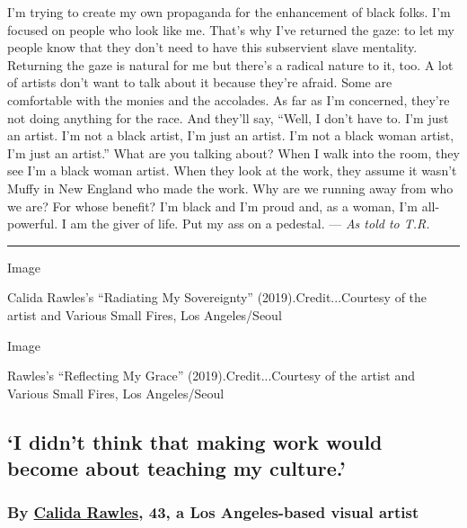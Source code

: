 I'm trying to create my own propaganda for the enhancement of black
folks. I'm focused on people who look like me. That's why I've returned
the gaze: to let my people know that they don't need to have this
subservient slave mentality. Returning the gaze is natural for me but
there's a radical nature to it, too. A lot of artists don't want to talk
about it because they're afraid. Some are comfortable with the monies
and the accolades. As far as I'm concerned, they're not doing anything
for the race. And they'll say, ``Well, I don't have to. I'm just an
artist. I'm not a black artist, I'm just an artist. I'm not a black
woman artist, I'm just an artist.'' What are you talking about? When I
walk into the room, they see I'm a black woman artist. When they look at
the work, they assume it wasn't Muffy in New England who made the work.
Why are we running away from who we are? For whose benefit? I'm black
and I'm proud and, as a woman, I'm all-powerful. I am the giver of life.
Put my ass on a pedestal. --- \emph{As told to T.R.}

\begin{center}\rule{0.5\linewidth}{\linethickness}\end{center}

Image

Calida Rawles's ``Radiating My Sovereignty'' (2019).Credit...Courtesy of
the artist and Various Small Fires, Los Angeles/Seoul

Image

Rawles's ``Reflecting My Grace'' (2019).Credit...Courtesy of the artist
and Various Small Fires, Los Angeles/Seoul

\hypertarget{i-didnt-think-that-making-work-would-become-about-teaching-my-culture}{%
\subsection{`I didn't think that making work would become about teaching
my
culture.'}\label{i-didnt-think-that-making-work-would-become-about-teaching-my-culture}}

\hypertarget{by-calida-rawles-43-a-los-angeles-based-visual-artist}{%
\subsubsection{\texorpdfstring{\textbf{By}
\textbf{\href{https://www.instagram.com/calidagarciarawles/?hl=en}{Calida
Rawles}, 43, a Los Angeles-based visual
artist}}{By Calida Rawles, 43, a Los Angeles-based visual artist}}\label{by-calida-rawles-43-a-los-angeles-based-visual-artist}}

